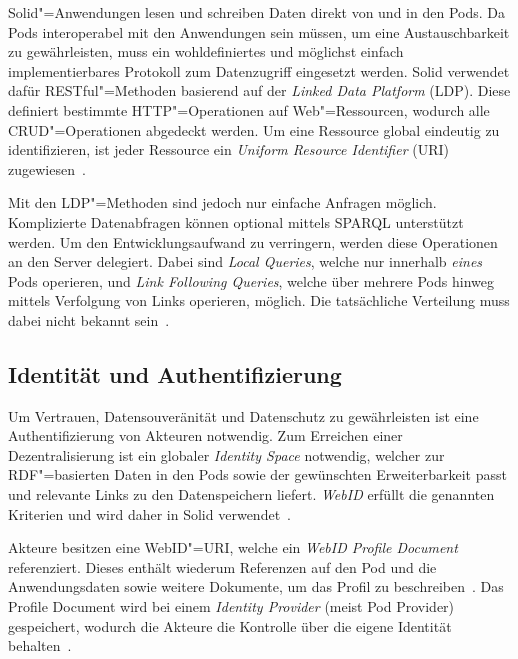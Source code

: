 Solid"=Anwendungen lesen und schreiben Daten direkt von und in den Pods.
Da Pods interoperabel mit den Anwendungen sein müssen, um eine Austauschbarkeit zu gewährleisten, muss ein wohldefiniertes und möglichst einfach implementierbares Protokoll zum Datenzugriff eingesetzt werden.
Solid verwendet dafür RESTful"=Methoden basierend auf der \emph{Linked Data Platform} (LDP).
Diese definiert bestimmte HTTP"=Operationen auf Web"=Ressourcen, wodurch alle CRUD"=Operationen abgedeckt werden.
Um eine Ressource global eindeutig zu identifizieren, ist jeder Ressource ein \emph{Uniform Resource Identifier} (URI) zugewiesen~\cite{mecklerWebLinkedData2023,sambraSolidPlatformDecentralized2016}.

Mit den LDP"=Methoden sind jedoch nur einfache Anfragen möglich.
Komplizierte Datenabfragen können optional mittels SPARQL unterstützt werden.
Um den Entwicklungsaufwand zu verringern, werden diese Operationen an den Server delegiert.
Dabei sind \emph{Local Queries}, welche nur innerhalb \emph{eines} Pods operieren, und \emph{Link Following Queries}, welche über mehrere Pods hinweg mittels Verfolgung von Links operieren, möglich.
Die tatsächliche Verteilung muss dabei nicht bekannt sein~\cite{sambraSolidPlatformDecentralized2016}.


\subsection{Identität und Authentifizierung}

Um Vertrauen, Datensouveränität und Datenschutz zu gewährleisten ist eine Authentifizierung von Akteuren notwendig.
Zum Erreichen einer Dezentralisierung ist ein globaler \emph{Identity Space} notwendig, welcher zur RDF"=basierten Daten in den Pods sowie der gewünschten Erweiterbarkeit passt und relevante Links zu den Datenspeichern liefert.
\emph{WebID} erfüllt die genannten Kriterien und wird daher in Solid verwendet~\cite{sambraSolidPlatformDecentralized2016}.

Akteure besitzen eine WebID"=URI, welche ein \emph{WebID Profile Document} referenziert.
Dieses enthält wiederum Referenzen auf den Pod und die Anwendungsdaten sowie weitere Dokumente, um das Profil zu beschreiben~\cite{solidcommunitygroupSolidWebIDProfile2024}.
Das Profile Document wird bei einem \emph{Identity Provider} (meist Pod Provider) gespeichert, wodurch die Akteure die Kontrolle über die eigene Identität behalten~\cite{sambraSolidPlatformDecentralized2016}.

